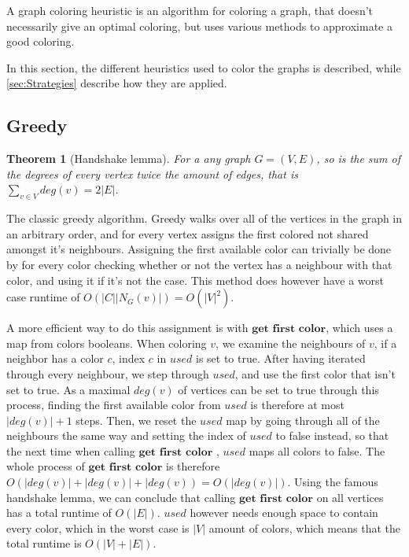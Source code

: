 \documentclass[a4paper]{article}
\newtheorem{theorem}{Theorem}[section]
\begin{document}
A graph coloring heuristic is an algorithm for coloring a graph, that doesn't
necessarily give an optimal coloring, but uses various methods to approximate a
good coloring.


In this section, the different heuristics used to color the graphs is described,
while \autoref{sec:Strategies} describe how they are applied.
\subsection{Greedy}

\begin{theorem}[Handshake lemma]{\cite{GraphBasics}}
    For a any graph $G = (V,E)$, so is the sum of the degrees of every vertex
    twice the amount of edges, that is $\sum_{v \in V} deg(v) = 2|E|$.
\end{theorem}

The classic greedy algorithm. Greedy walks over all of the vertices in the graph
in an arbitrary order, and for every vertex assigns the first colored not shared
amongst it's neighbours. Assigning the first available color can trivially be done
by for every color checking whether or not the vertex has a neighbour with that color,
and using it if it's not the case. This method does however
have a worst case runtime of $O(|C||N_G(v)|) = O(|V|^2)$. 

A more efficient way to do this assignment is with $\textbf{get first color}$,
which uses a map from colors booleans. When coloring $v$, we examine the
neighbours of $v$, if a neighbor has a color $c$, index $c$ in $used$ is set to
true. After having iterated through every neighbour, we step through $used$,
and use the first color that isn't set to true. As a maximal $deg(v)$ of
vertices can be set to true through this process, finding the first available
color from $used$ is therefore at most  $|deg(v)|+1$ steps. Then, we reset the
$used$ map by going through all of the neighbours the same way and setting the
index of $used$ to false instead, so that the next time when calling
$\textbf{get first color}$ , $used$ maps all colors to false. The whole process
of $\textbf{get first color}$ is therefore $O(|deg(v)|+|deg(v)| + |deg(v)) =
O(|deg(v)|)$. Using the famous handshake lemma, we can conclude that calling
$\textbf{get first color}$ on all vertices has a total runtime of $O(|E|)$.
$used$ however needs enough space to contain every color, which in the worst
case is $|V|$ amount of colors, which means that the total runtime is
$O(|V|+|E|)$.
\end{document}
